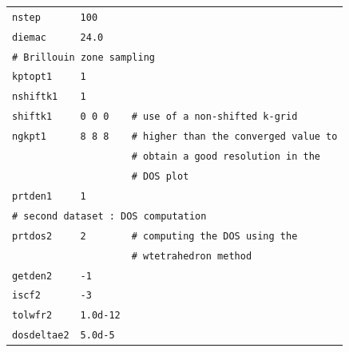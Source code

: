 \documentclass[11pt,a4paper]{article}
\begin{document}
\begin{center}
\begin{tabular}{lll}
\texttt{nstep}&\texttt{100}&\\
\texttt{diemac}&\texttt{24.0}&\\
\multicolumn{3}{l}{\texttt{\# Brillouin zone sampling}}\\
\texttt{kptopt1}&\texttt{1}&\\
\texttt{nshiftk1}&\texttt{1}&\\
\texttt{shiftk1}&\texttt{0 0 0}&\texttt{\# use of a non-shifted k-grid}\\
\texttt{ngkpt1}&\texttt{8 8 8}&\texttt{\# higher than the converged value to}\\
&&\texttt{\# obtain a good resolution in the}\\
&&\texttt{\# DOS plot}\\
\texttt{prtden1}&\texttt{1}&\\
\multicolumn{3}{l}{\texttt{\# second dataset : DOS computation}}\\
\texttt{prtdos2}&\texttt{2}&\texttt{\# computing the DOS using the}\\
&&\texttt{\# wtetrahedron method}\\
\texttt{getden2}&\texttt{-1}&\\
\texttt{iscf2}&\texttt{-3}&\\
\texttt{tolwfr2}&\texttt{1.0d-12}&\\
\texttt{dosdeltae2}&\texttt{5.0d-5}&\\
\end{tabular}
\end{center}
\newpage
\end{document}
